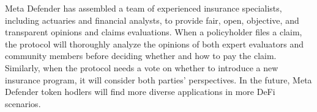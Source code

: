Meta Defender has assembled a team of experienced insurance specialists, including actuaries and financial analysts, to provide fair, open, objective, and transparent opinions and claims evaluations.
When a policyholder files a claim, the protocol will thoroughly analyze the opinions of both expert evaluators and community members before deciding whether and how to pay the claim.
Similarly, when the protocol needs a vote on whether to introduce a new insurance program, it will consider both parties' perspectives.
In the future, Meta Defender token hodlers will find more diverse applications in more DeFi scenarios.
